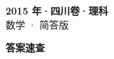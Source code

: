 \documentclass[zihao=-4, a4paper]{ctexart}
\begin{document}
\begin{center}
  {\Large\bfseries 2015 年·四川卷·理科}\\[4pt]
  {\large 数学 · 简答版}
\end{center}
\medskip
{}

\clearpage
{}
\begin{center}{\Large\bfseries 答案速查}\end{center}
\medskip

\end{document}
